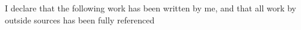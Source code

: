 I declare that the following work has been written by me, and that all work by
outside sources has been fully referenced
